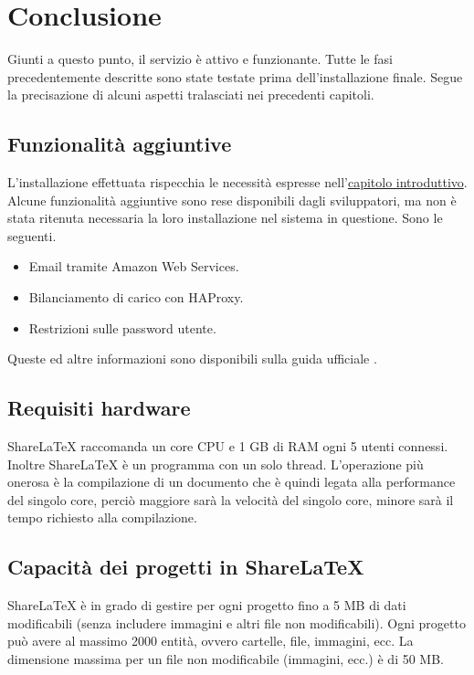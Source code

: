 \chapter{Conclusione}
\label{Conclusione}
\thispagestyle{plain}

Giunti a questo punto, il servizio è attivo e funzionante. Tutte le fasi precedentemente descritte sono state testate prima dell'installazione finale. Segue la precisazione di alcuni aspetti tralasciati nei precedenti capitoli.

\section{Funzionalità aggiuntive}
L'installazione effettuata rispecchia le necessità espresse nell'\hyperref[Introduzione]{capitolo introduttivo}. Alcune funzionalità aggiuntive sono rese disponibili dagli sviluppatori, ma non è stata ritenuta necessaria la loro installazione nel sistema in questione. Sono le seguenti.
\begin{itemize}
    \item Email tramite Amazon Web Services.
    \item Bilanciamento di carico con HAProxy.
    \item Restrizioni sulle password utente.
\end{itemize}
Queste ed altre informazioni sono disponibili sulla guida ufficiale \cite{sharelatex_wiki}.

\section{Requisiti hardware}
ShareLaTeX raccomanda un core CPU e 1 GB di RAM ogni 5 utenti connessi. Inoltre ShareLaTeX è un programma con un solo thread. L'operazione più onerosa è la compilazione di un documento che è quindi legata alla performance del singolo core, perciò maggiore sarà la velocità del singolo core, minore sarà il tempo richiesto alla compilazione.

\section{Capacità dei progetti in ShareLaTeX}
ShareLaTeX è in grado di gestire per ogni progetto fino a 5 MB di dati modificabili (senza includere immagini e altri file non modificabili). Ogni progetto può avere al massimo 2000 entità, ovvero cartelle, file, immagini, ecc. La dimensione massima per un file non modificabile (immagini, ecc.) è di 50 MB.